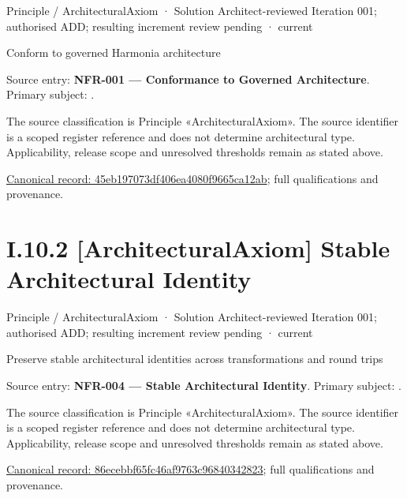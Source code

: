 \label{element:45eb197073df406ea4080f9665ca12ab}
{\small Principle / ArchitecturalAxiom · Solution Architect-reviewed Iteration 001; authorised ADD; resulting increment review pending · current}\par

Conform to governed Harmonia architecture



Source entry: \textbf{NFR-001 — Conformance to Governed Architecture}. Primary subject: \texttt{}.



The source classification is Principle «ArchitecturalAxiom». The source identifier is a scoped register reference and does not determine architectural type. Applicability, release scope and unresolved thresholds remain as stated above.


{\footnotesize \href{../../../../continuum/motivation/principle/architectural-axiom/45eb197073df406ea4080f9665ca12ab.md}{Canonical record: 45eb197073df406ea4080f9665ca12ab}; full qualifications and provenance.}\par
\section*{I.10.2 [ArchitecturalAxiom] Stable Architectural Identity}
\label{navigation:I.10.2}

\label{element:86ecebbf65fc46af9763c96840342823}
{\small Principle / ArchitecturalAxiom · Solution Architect-reviewed Iteration 001; authorised ADD; resulting increment review pending · current}\par

Preserve stable architectural identities across transformations and round trips



Source entry: \textbf{NFR-004 — Stable Architectural Identity}. Primary subject: \texttt{}.



The source classification is Principle «ArchitecturalAxiom». The source identifier is a scoped register reference and does not determine architectural type. Applicability, release scope and unresolved thresholds remain as stated above.


{\footnotesize \href{../../../../continuum/motivation/principle/architectural-axiom/86ecebbf65fc46af9763c96840342823.md}{Canonical record: 86ecebbf65fc46af9763c96840342823}; full qualifications and provenance.}\par
